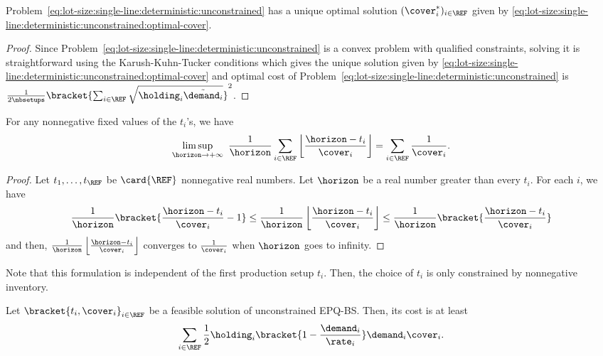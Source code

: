 \begin{lem}\label{lem:lot-size:single-line:deterministic:unconstrained:optimality}
Problem~\eqref{eq:lot-size:single-line:deterministic:unconstrained} has a unique optimal solution $(\cover_i^*)_{i\in\REF}$ given by \cref{eq:lot-size:single-line:deterministic:unconstrained:optimal-cover}.
\end{lem}


\begin{proof}
Since Problem~\eqref{eq:lot-size:single-line:deterministic:unconstrained} is a convex problem with qualified constraints, solving it is straightforward using the Karush-Kuhn-Tucker conditions which gives the unique solution given by \cref{eq:lot-size:single-line:deterministic:unconstrained:optimal-cover} and optimal cost of Problem~\eqref{eq:lot-size:single-line:deterministic:unconstrained} is $\frac{1}{2\nbsetups}\bracket{\sum_{i\in\REF}\sqrt{\holding_i\tilde{\demand_i}}}^2$.
\end{proof}



\begin{lem}\label{lem:lot-size:deterministic:single-line:models:average-setup}
For any nonnegative fixed values of the $t_i$'s, we have
\begin{equation}
\limsup_{\horizon\rightarrow+\infty}\ \frac{1}{\horizon} \sum_{i\in\REF} \left\lfloor\frac{\horizon-t_i}{\cover_i}\right\rfloor
=
\sum_{i\in\REF} \frac{1}{\cover_i}.
\end{equation}
\end{lem}


\begin{proof}
Let $t_1,\ldots,t_{\REF}$ be $\card{\REF}$ nonnegative real numbers.
Let $\horizon$ be a real number greater than every $t_i$.
For each $i$, we have
\begin{equation}
\frac{1}{\horizon}\bracket{\frac{\horizon-t_i}{\cover_i}-1}
\le
\frac{1}{\horizon}\left\lfloor\frac{\horizon-t_i}{\cover_i}\right\rfloor
\le
\frac{1}{\horizon}\bracket{\frac{\horizon-t_i}{\cover_i}}
\end{equation}
and then, $\frac{1}{\horizon}\left\lfloor\frac{\horizon-t_i}{\cover_i}\right\rfloor$ converges to $\frac{1}{\cover_i}$ when $\horizon$ goes to infinity.
\end{proof}


Note that this formulation is independent of the first production setup $t_i$.
Then, the choice of $t_i$ is only constrained by nonnegative inventory.


\begin{lem}\label{lem:lot-size:deterministic:single-line:models:ZIO}
Let $\bracket{t_i,\cover_i}_{i\in\REF}$ be a feasible solution of unconstrained EPQ-BS.
Then, its cost is at least
\begin{equation}
  \sum_{i\in\REF}\frac{1}{2}\holding_i\bracket{1-\frac{\demand_i}{\rate_i}}\demand_i\cover_i.
\end{equation}
\end{lem}


